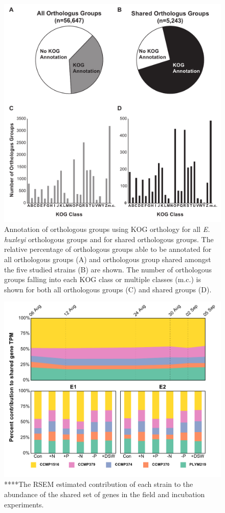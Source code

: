 \begin{figure}[p!]

  \centering
  \includegraphics[width=.75\textwidth]{Images/C6_FigureS9_KOGAnnotation.pdf}
  \caption[Annotation of orthologous groups using KOG orthology for all \textit{E. huxleyi} orthologous groups and for shared orthologous groups]{Annotation of orthologous groups using KOG orthology for all \textit{E. huxleyi} orthologous groups and for shared orthologous groups. The relative percentage of orthologous groups able to be annotated for all orthologous groups (A) and orthologous group shared amongst the five studied strains (B) are shown. The number of orthologous groups falling into each KOG class or multiple classes (m.c.) is shown for both all orthologous groups (C) and shared groups (D). }
    \label{fig:a5f9}
\end{figure}



\begin{figure}[p!]

  \centering
  \includegraphics[width=1\textwidth]{Images/C6_FigureS10_SharedGeneComp.pdf}
  \caption{****The RSEM estimated contribution of each strain to the abundance of the shared set of genes in the field and incubation experiments.}
    \label{fig:a5f9}
\end{figure}

